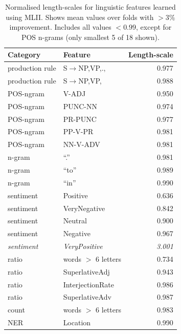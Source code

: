 \begin{table}[t]
\small
  \begin{tabularx}{\columnwidth}{l | X | r }
  Category & Feature & Length-scale\\
  \hline
  production rule & S$\to$NP,VP,.,	& 0.977\nonumber\\  
  production rule & S$\to$NP,VP,	& 0.988\nonumber\\  
  \hline
  POS-ngram & V-ADJ	& 0.950	\nonumber\\
  POS-ngram & PUNC-NN	& 0.974 \nonumber\\  
  POS-ngram & PR-PUNC	& 0.977	\nonumber\\
  POS-ngram & PP-V-PR	& 0.981\nonumber\\
  POS-ngram & NN-V-ADV	& 0.981\nonumber\\    
  \hline
  n-gram & ``.''	& 0.981\nonumber\\
  n-gram & ``to'' 	& 0.989\nonumber\\
  n-gram & ``in''	& 0.990\nonumber\\  
  \hline
  sentiment & Positive	& 0.636 \nonumber\\
  sentiment & VeryNegative	 & 0.842 \nonumber\\
  sentiment & Neutral	& 0.900 \nonumber\\
  sentiment & Negative & 0.967 \nonumber\\    
\emph{sentiment} & \emph{VeryPositive} & \emph{3.001} \nonumber \\%
\hline
  ratio & words $>$ 6 letters & 0.734 \nonumber\\
  ratio & SuperlativeAdj	& 0.943 \nonumber\\
  ratio & InterjectionRate	& 0.986 \nonumber\\
  ratio &	SuperlativeAdv	& 0.987 \nonumber\\
 \hline
  count & words $>$ 6 letters	& 0.983 \nonumber\\  
 \hline
  NER & Location & 0.990 \nonumber  
  \end{tabularx}
  \caption{Normalised length-scales for linguistic features learned using MLII. Shows mean values over folds with $>3\%$ improvement. Includes all values $<0.99$, except for POS n-grams (only smallest 5 of 18 shown).  }
  \label{tab:extreme_features}
\end{table}

